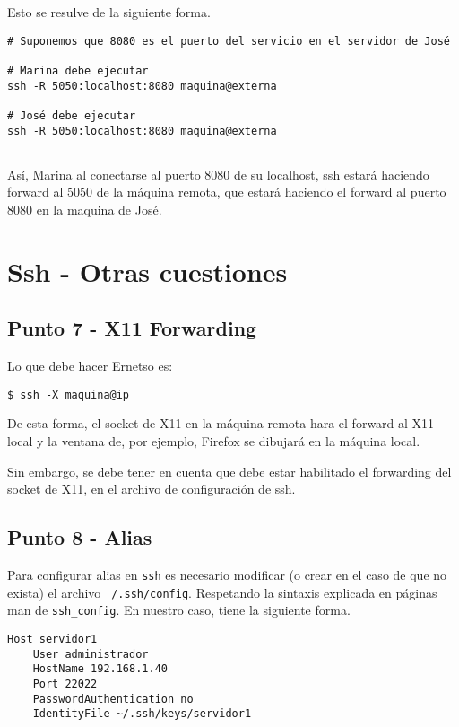 Esto se resulve de la siguiente forma.

\begin{lstlisting}
# Suponemos que 8080 es el puerto del servicio en el servidor de José

# Marina debe ejecutar
ssh -R 5050:localhost:8080 maquina@externa

# José debe ejecutar 
ssh -R 5050:localhost:8080 maquina@externa
 
\end{lstlisting}

Así, Marina al conectarse al puerto 8080 de su localhost, ssh estará haciendo forward al 5050 de la máquina remota, que estará haciendo el forward al puerto 8080 en la maquina de José.

\section*{Ssh - Otras cuestiones}

\subsection*{Punto 7 - X11 Forwarding}

Lo que debe hacer Ernetso es:

\begin{lstlisting}
$ ssh -X maquina@ip
\end{lstlisting}

De esta forma, el socket de X11 en la máquina remota hara el forward al X11 local y la ventana de, por ejemplo, Firefox se dibujará en la máquina local.

Sin embargo, se debe tener en cuenta que debe estar habilitado el forwarding del socket de X11, en el archivo de configuración de ssh.

\subsection*{Punto 8 - Alias}

Para configurar alias en \texttt{ssh} es necesario modificar (o crear en el caso de que no exista) el archivo \texttt{~/.ssh/config}. Respetando la sintaxis explicada en páginas man de \texttt{ssh\_config}. En nuestro caso, tiene la siguiente forma.

\begin{lstlisting}
Host servidor1
    User administrador
    HostName 192.168.1.40
    Port 22022
    PasswordAuthentication no
    IdentityFile ~/.ssh/keys/servidor1
\end{lstlisting}

